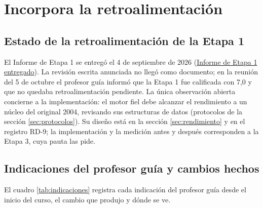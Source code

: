 \chapter{Incorpora la retroalimentación}
\label{cap:retro}

\section{Estado de la retroalimentación de la Etapa 1}
\label{sec:estado-retro}

El Informe de Etapa 1 se entregó el 4 de septiembre de 2026 (\href{run:../evidence/informe-etapa-1.pdf}{Informe de Etapa 1 entregado}). La revisión escrita anunciada no llegó como
documento; en la reunión del 5 de octubre el profesor guía informó que la Etapa 1 fue
calificada con 7,0 y que no quedaba retroalimentación pendiente. La única observación abierta
concierne a la implementación: el motor fiel debe alcanzar el rendimiento a un núcleo del
original 2004, revisando sus estructuras de datos (protocolos de la sección
\ref{sec:protocolos}). Su diseño está en la sección
\ref{sec:rendimiento} y en el registro RD-9; la implementación y la medición antes y después
corresponden a la Etapa 3, cuya pauta las pide.

\section{Indicaciones del profesor guía y cambios hechos}
\label{sec:indicaciones}

El cuadro \ref{tab:indicaciones} registra cada indicación del profesor guía desde el inicio
del curso, el cambio que produjo y dónde se ve.

